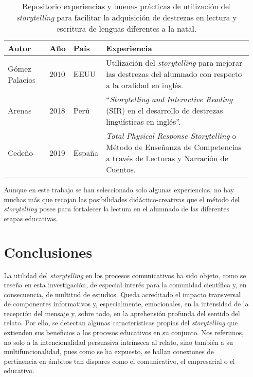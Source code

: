 \documentclass[spanish]{textolivre}
\begin{document}
\begin{table}[h!]
\begin{threeparttable}
\caption{Repositorio experiencias y buenas prácticas de utilización del \textit{storytelling} para facilitar la adquisición de destrezas en lectura y escritura de lenguas diferentes a la natal.}
\label{tab02}
\centering
\begin{tabular}{p{} p{1cm} p{2cm} p{7cm}}
\toprule 
\textbf{Autor} & \textbf{Año} & \textbf{País} & \textbf{Experiencia}  \\
\midrule
Gómez Palacios & 2010 & EEUU & Utilización del \textit{storytelling} para mejorar las destrezas del alumnado con respecto a la oralidad en inglés. \\
Arenas & 2018 & Perú & “\textit{Storytelling and Interactive Reading} (SIR) en el desarrollo de destrezas lingüísticas en inglés”. \\
Cedeño & 2019 & España & \textit{Total Physical Response Storytelling} o Método de Enseñanza de Competencias a través de Lecturas y Narración de Cuentos. \\
\bottomrule
\end{tabular}
\end{threeparttable}
\end{table}

Aunque en este trabajo se han seleccionado solo algunas experiencias, no hay muchas más que recojan las posibilidades didáctico-creativas que el método del \textit{storytelling} posee para fortalecer la lectura en el alumnado de las diferentes etapas educativas.

\section{Conclusiones}\label{sec-idioma}
La utilidad del \textit{storytelling} en los procesos comunicativos ha sido objeto, como se reseña en esta investigación, de especial interés para la comunidad científica y, en consecuencia, de multitud de estudios. Queda acreditado el impacto transversal de componentes informativos y, especialmente, emocionales, en la intensidad de la recepción del mensaje y, sobre todo, en la aprehensión profunda del sentido del relato. Por ello, se detectan algunas características propias del \textit{storytelling} que extienden sus beneficios a los procesos educativos en su conjunto. Nos referimos, no solo a la intencionalidad persuasiva intrínseca al relato, sino también a su multifuncionalidad, pues como se ha expuesto, se hallan conexiones de pertinencia en ámbitos tan dispares como el comunicativo, el empresarial o el educativo. 
\end{document}
